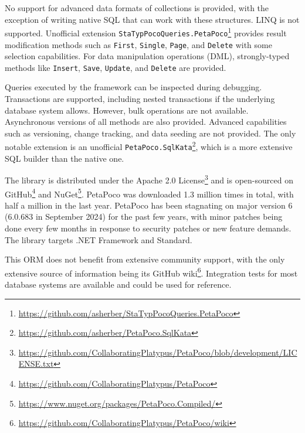No support for advanced data formats of collections is provided, with the exception of writing native SQL that can work with these structures. LINQ is not supported. Unofficial extension \texttt{StaTypPocoQueries.PetaPoco}\footnote{\url{https://github.com/asherber/StaTypPocoQueries.PetaPoco}} provides result modification methods such as \texttt{First}, \texttt{Single}, \texttt{Page}, and \texttt{Delete} with some selection capabilities. For data manipulation operations (DML), strongly-typed methods like \texttt{Insert}, \texttt{Save}, \texttt{Update}, and \texttt{Delete} are provided. 

Queries executed by the framework can be inspected during debugging. Transactions are supported, including nested transactions if the underlying database system allows. However, bulk operations are not available. Asynchronous versions of all methods are also provided. Advanced capabilities such as versioning, change tracking, and data seeding are not provided. The only notable extension is an unofficial \texttt{PetaPoco.SqlKata}\footnote{\url{https://github.com/asherber/PetaPoco.SqlKata}}, which is a more extensive SQL builder than the native one.

The library is distributed under the Apache 2.0 License\footnote{\url{https://github.com/CollaboratingPlatypus/PetaPoco/blob/development/LICENSE.txt}} and is open-sourced on GitHub\footnote{\url{https://github.com/CollaboratingPlatypus/PetaPoco}} and NuGet\footnote{\url{https://www.nuget.org/packages/PetaPoco.Compiled/}}. PetaPoco was downloaded 1.3 million times in total, with half a million in the last year. PetaPoco has been stagnating on major version 6 (6.0.683 in September 2024) for the past few years, with minor patches being done every few months in response to security patches or new feature demands. The library targets .NET Framework and Standard.

This ORM does not benefit from extensive community support, with the only extensive source of information being its GitHub wiki\footnote{\url{https://github.com/CollaboratingPlatypus/PetaPoco/wiki}}. Integration tests for most database systems are available and could be used for reference.


